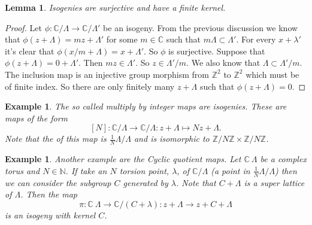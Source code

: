 \documentclass[a4paper]{article}
\theoremstyle{theoremdd}
\newtheorem{lemma}[theorem]{Lemma}
\theoremstyle{definitiondd}
\theoremstyle{remarkdd}
\newtheorem{example}[theorem]{Example}
\newcommand{\N}{\mathbb{N}}
\newcommand{\Z}{\mathbb{Z}}
\newcommand{\C}{\mathbb{C}}
\begin{document}
\begin{lemma}
	Isogenies are surjective and have a finite kernel. 
\end{lemma}
\begin{proof}
	Let $\phi: \C / \Lambda \to \C / \Lambda'$ be an isogeny. 
	From the previous discussion we know that $\phi(z+\Lambda) = mz + \Lambda'$ for some $m \in\C$ such that $m \Lambda \subset  \Lambda'$. 
	For every  $x + \lambda'$ it's clear that  $\phi( x / m + \Lambda) = x + \Lambda'$. 
	So  $\phi$ is surjective. 
	Suppose that $\phi(z + \Lambda) = 0 + \Lambda'$. Then  $m z \in \Lambda'$. So  $z \in  \Lambda'/m$. 
	We also know that  $\Lambda \subset \Lambda' / m$. 
	The inclusion map is an injective group morphism from $\Z^2$ to  $\Z^2$ which must be of finite index. 
	So there are only finitely many $z + \Lambda$ such that  $\phi(z + \Lambda) = 0$.
\end{proof}
\begin{example}
	The so called \emph{multiply by integer maps} are isogenies. These are maps of the form \[
		[N]: \C / \Lambda \to \C / \Lambda: z + \Lambda \mapsto  Nz + \Lambda
	.\] 
	Note that the of this map is $\frac{1}{N}\Lambda / \Lambda$ and is isomorphic to $\Z / N \Z \times  \Z / N \Z$. 
\end{example}
\begin{example}
	Another example are the \emph{Cyclic quotient maps}. 
	Let  $\C \ \Lambda$ be a complex torus and  $N \in \N$.
	If take an $N$ torsion point, $\lambda$, of $\C / \Lambda$ (a point in $\frac{1}{N} \Lambda / \Lambda$) then we can consider the subgroup $C$ generated by $\lambda$. Note that $C + \Lambda$ is a super lattice of $\Lambda$. Then the map \[
		\pi: \C \ \Lambda \to \C / (C + \lambda): z + \Lambda \to z + C + \Lambda
	\]  
	is an isogeny with kernel $C$. 
\end{example}
\end{document}

